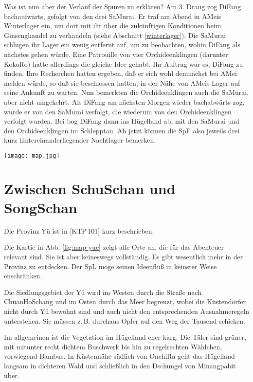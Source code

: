 \documentclass[
a4paper,
twoside,
DIV=calc,
BCOR=4mm,
fontsize=9pt,
twocolumn=on,
titlepage=on,
parskip=half
]{scrartcl}
\begin{document}
Was ist nun aber der Verlauf der Spuren zu erklären? Am 3. Draug zog
DiFang bachaufwärts, gefolgt von den drei SaMurai. Er traf am Abend in
AMeis Winterlager ein, um dort mit ihr über die zukünftigen
Konditionen beim Ginsenghandel zu verhandeln (siehe Abschnitt
\ref{winterlager}). Die SaMurai schlugen ihr Lager ein wenig entfernt
auf, um zu beobachten, wohin DiFang als nächstes gehen würde. Eine
Patrouille von vier Orchideenklingen (darunter KokoRo) hatte
allerdings die gleiche Idee gehabt. Ihr Auftrag war es, DiFang zu
finden. Ihre Recherchen hatten ergeben, daß er sich wohl demnächst bei
AMei melden würde, so daß sie beschlossen hatten, in der Nähe von
AMeis Lager auf seine Ankunft zu warten. Nun bemerkten die
Orchideenklingen auch die SaMurai, aber nicht umgekehrt. Als DiFang am
nächsten Morgen wieder bachabwärts zog, wurde er von den SaMurai
verfolgt, die wiederum von den Orchideenklingen verfolgt wurden. Bei
 bog DiFang dann ins Hügelland ab, mit den SaMurai und den
Orchideenklingen im Schlepptau. Ab jetzt können die SpF also jeweils
drei kurz hintereinanderliegender Nachtlager bemerken.

\begin{figure*}[p]
  \centering
  \texttt{[image: map.jpg]}
  \caption{Die Provinz Yü}
  \label{fig:map-yue}
\end{figure*}

\section{Zwischen SchuSchan und SongSchan}
\label{yue}

Die Provinz Yü ist in [KTP\,101] kurz beschrieben.

Die Kartie in Abb. \ref{fig:map-yue} zeigt alle Orte an, die für das
Abenteuer relevant sind. Sie ist aber keineswegs vollständig. Es gibt
wesentlich mehr in der Provinz zu entdecken. Der SpL möge seinen
Ideenfluß in keinster Weise enschränken.

Die Siedlungsgebiet der Yü wird im Westen durch die Straße nach
ChüanHoSchang und im Osten durch das Meer begrenzt, wobei die
Küstendörfer nicht durch Yü bewohnt sind und auch nicht den
entsprechenden Ausnahmeregeln unterstehen. Sie müssen z.\,B. durchaus
Opfer auf den Weg der Tausend schicken.

Im allgemeinen ist die Vegetation im Hügelland eher karg. Die Täler
sind grüner, mit mitunter recht dichtem Buschwerk bis hin zu
regelrechten Wäldchen, vorwiegend Bambus. In Küstennähe südlich von
OnchiRa geht das Hügelland langsam in dichteren Wald und schließlich
in den Dschungel von Minangpahit über.
\end{document}
